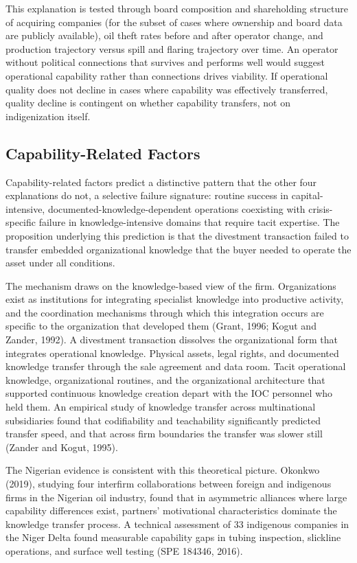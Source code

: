 \documentclass[twoside,fontset=lmodern]{mitthesis}
\begin{document}
This explanation is tested through board composition and shareholding
structure of acquiring companies (for the subset of cases where
ownership and board data are publicly available), oil theft rates before
and after operator change, and production trajectory versus spill and
flaring trajectory over time. An operator without political connections
that survives and performs well would suggest operational capability
rather than connections drives viability. If operational quality does
not decline in cases where capability was effectively transferred,
quality decline is contingent on whether capability transfers, not on
indigenization itself.

\hypertarget{capability-related-factors}{%
\subsection{Capability-Related
Factors}\label{capability-related-factors}}

Capability-related factors predict a distinctive pattern that the other
four explanations do not, a selective failure signature: routine success
in capital-intensive, documented-knowledge-dependent operations
coexisting with crisis-specific failure in knowledge-intensive domains
that require tacit expertise. The proposition underlying this prediction
is that the divestment transaction failed to transfer embedded
organizational knowledge that the buyer needed to operate the asset
under all conditions.

The mechanism draws on the knowledge-based view of the firm.
Organizations exist as institutions for integrating specialist knowledge
into productive activity, and the coordination mechanisms through which
this integration occurs are specific to the organization that developed
them (Grant, 1996; Kogut and Zander, 1992). A divestment transaction
dissolves the organizational form that integrates operational knowledge.
Physical assets, legal rights, and documented knowledge transfer through
the sale agreement and data room. Tacit operational knowledge,
organizational routines, and the organizational architecture that
supported continuous knowledge creation depart with the IOC personnel
who held them. An empirical study of knowledge transfer across
multinational subsidiaries found that codifiability and teachability
significantly predicted transfer speed, and that across firm boundaries
the transfer was slower still (Zander and Kogut, 1995).

The Nigerian evidence is consistent with this theoretical picture.
Okonkwo (2019), studying four interfirm collaborations between foreign
and indigenous firms in the Nigerian oil industry, found that in
asymmetric alliances where large capability differences exist, partners'
motivational characteristics dominate the knowledge transfer process. A
technical assessment of 33 indigenous companies in the Niger Delta found
measurable capability gaps in tubing inspection, slickline operations,
and surface well testing (SPE 184346, 2016).
\end{document}
